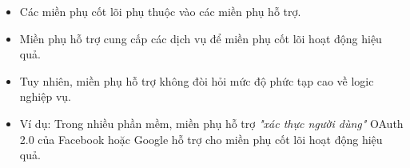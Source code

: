 \begin{itemize}

\item Các miền phụ cốt lõi phụ thuộc vào các miền phụ hỗ trợ.

\item Miền phụ hỗ trợ cung cấp các dịch vụ để miền phụ cốt lõi hoạt động hiệu quả.

\item Tuy nhiên, miền phụ hỗ trợ không đòi hỏi mức độ phức tạp cao về logic nghiệp vụ.

\item Ví dụ: Trong nhiều phần mềm, miền phụ hỗ trợ \textit{"xác thực người dùng"} OAuth 2.0 của Facebook hoặc Google hỗ trợ cho miền phụ cốt lõi hoạt động hiệu quả.

\end{itemize}